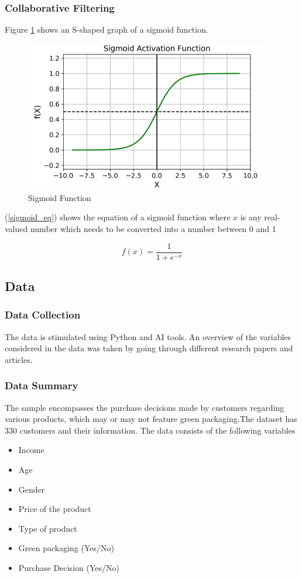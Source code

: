 \documentclass[a4paper,10pt]{article}
\begin{document}
\subsubsection{Collaborative Filtering}


Figure \ref{sigmoid} shows an S-shaped graph of a sigmoid function. 


\begin{figure}[ht]
\centering
\includegraphics[height=6.6cm]{figures/sigmoid.png}
\caption{Sigmoid Function}
\label{sigmoid}
\end{figure}

(\ref{sigmoid_eq}) shows the equation of a sigmoid function where $x$ is any real-valued number which needs to be converted into a number between 0 and 1

\begin{equation}
f(x) = \frac{1}{1 + e^{-x}}
\label{sigmoid_eq}
\end{equation}

\subsection{Data}
\subsubsection{Data Collection}

The data is stimulated using Python and AI tools. An overview of the variables considered in the data was taken by going through different research papers and articles. 

\subsubsection{Data Summary}
The sample encompasses the purchase decisions made by customers regarding various products, which may or may not feature green packaging.The dataset has 330 customers and their information. 
The data consists of the following variables
\begin{itemize}

    \item Income 
    \item Age 
    \item Gender 
    \item Price of the product
    \item Type of product
    \item Green packaging (Yes/No)
    \item Purchase Decision (Yes/No)
\end{itemize}
\end{document}

